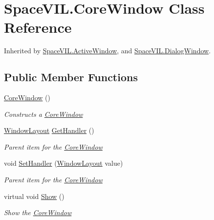 \hypertarget{class_space_v_i_l_1_1_core_window}{}\section{Space\+V\+I\+L.\+Core\+Window Class Reference}
\label{class_space_v_i_l_1_1_core_window}


Inherited by \mbox{\hyperlink{class_space_v_i_l_1_1_active_window}{Space\+V\+I\+L.\+Active\+Window}}, and \mbox{\hyperlink{class_space_v_i_l_1_1_dialog_window}{Space\+V\+I\+L.\+Dialog\+Window}}.

\subsection*{Public Member Functions}
\begin{DoxyCompactItemize}
\item 
\mbox{\hyperlink{class_space_v_i_l_1_1_core_window_a49cb7bafc382c7d12250676e20c3327b}{Core\+Window}} ()
\begin{DoxyCompactList}\small\item\em Constructs a \mbox{\hyperlink{class_space_v_i_l_1_1_core_window}{Core\+Window}} \end{DoxyCompactList}\item 
\mbox{\hyperlink{class_space_v_i_l_1_1_window_layout}{Window\+Layout}} \mbox{\hyperlink{class_space_v_i_l_1_1_core_window_ac4c8503aa1fdd2ed2f0fd3ff278f8bee}{Get\+Handler}} ()
\begin{DoxyCompactList}\small\item\em Parent item for the \mbox{\hyperlink{class_space_v_i_l_1_1_core_window}{Core\+Window}} \end{DoxyCompactList}\item 
void \mbox{\hyperlink{class_space_v_i_l_1_1_core_window_a24e6d614aac5f7e1c8274edf92c214c5}{Set\+Handler}} (\mbox{\hyperlink{class_space_v_i_l_1_1_window_layout}{Window\+Layout}} value)
\begin{DoxyCompactList}\small\item\em Parent item for the \mbox{\hyperlink{class_space_v_i_l_1_1_core_window}{Core\+Window}} \end{DoxyCompactList}\item 
virtual void \mbox{\hyperlink{class_space_v_i_l_1_1_core_window_a6f25e26e98c54d56d93b0abfc88af3c0}{Show}} ()
\begin{DoxyCompactList}\small\item\em Show the \mbox{\hyperlink{class_space_v_i_l_1_1_core_window}{Core\+Window}} \end{DoxyCompactList}\item 

\end{DoxyCompactItemize}
